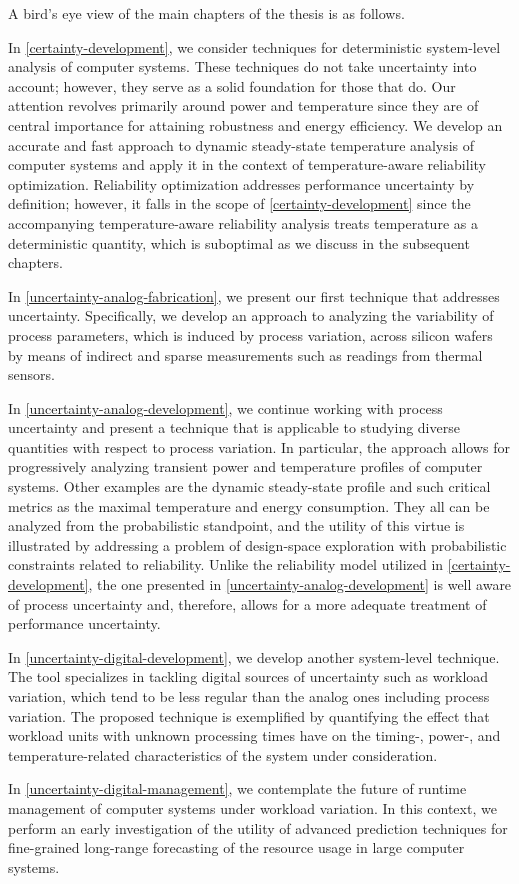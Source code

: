 A bird's eye view of the main chapters of the thesis is as follows.

In \cref{certainty-development}, we consider techniques for deterministic
system-level analysis of computer systems. These techniques do not take
uncertainty into account; however, they serve as a solid foundation for those
that do. Our attention revolves primarily around power and temperature since
they are of central importance for attaining robustness and energy efficiency.
We develop an accurate and fast approach to dynamic steady-state temperature
analysis of computer systems and apply it in the context of temperature-aware
reliability optimization. Reliability optimization addresses performance
uncertainty by definition; however, it falls in the scope of
\cref{certainty-development} since the accompanying temperature-aware
reliability analysis treats temperature as a deterministic quantity, which is
suboptimal as we discuss in the subsequent chapters.

In \cref{uncertainty-analog-fabrication}, we present our first technique that
addresses uncertainty. Specifically, we develop an approach to analyzing the
variability of process parameters, which is induced by process variation, across
silicon wafers by means of indirect and sparse measurements such as readings
from thermal sensors.

In \cref{uncertainty-analog-development}, we continue working with process
uncertainty and present a technique that is applicable to studying diverse
quantities with respect to process variation. In particular, the approach allows
for progressively analyzing transient power and temperature profiles of computer
systems. Other examples are the dynamic steady-state profile and such critical
metrics as the maximal temperature and energy consumption. They all can be
analyzed from the probabilistic standpoint, and the utility of this virtue is
illustrated by addressing a problem of design-space exploration with
probabilistic constraints related to reliability. Unlike the reliability model
utilized in \cref{certainty-development}, the one presented in
\cref{uncertainty-analog-development} is well aware of process uncertainty and,
therefore, allows for a more adequate treatment of performance uncertainty.

In \cref{uncertainty-digital-development}, we develop another system-level
technique. The tool specializes in tackling digital sources of uncertainty such
as workload variation, which tend to be less regular than the analog ones
including process variation. The proposed technique is exemplified by
quantifying the effect that workload units with unknown processing times have on
the timing-, power-, and temperature-related characteristics of the system under
consideration.

In \cref{uncertainty-digital-management}, we contemplate the future of runtime
management of computer systems under workload variation. In this context, we
perform an early investigation of the utility of advanced prediction techniques
for fine-grained long-range forecasting of the resource usage in large computer
systems.
